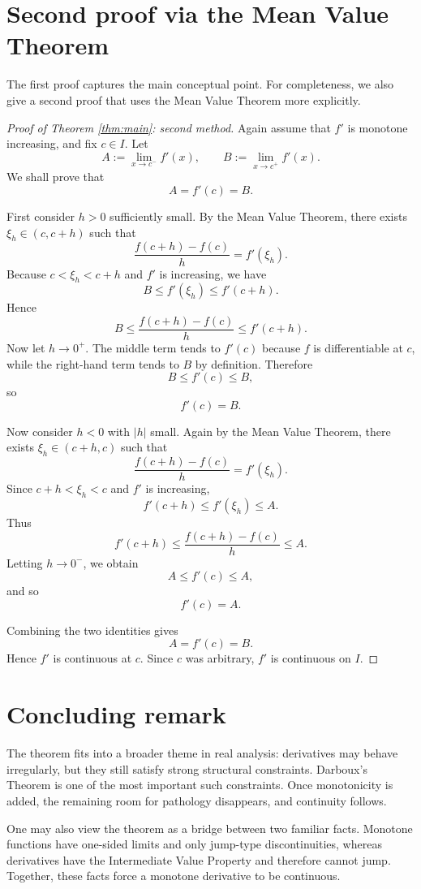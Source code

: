 \documentclass[11pt,a4paper]{amsart}
\theoremstyle{remark}
\begin{document}
\section{Second proof via the Mean Value Theorem}

The first proof captures the main conceptual point.
For completeness, we also give a second proof that uses the Mean Value Theorem more explicitly.

\begin{proof}[Proof of Theorem \ref{thm:main}: second method]
Again assume that $f'$ is monotone increasing, and fix $c\in I$.
Let
\[
A:=\lim_{x\to c^-}f'(x),
\qquad
B:=\lim_{x\to c^+}f'(x).
\]
We shall prove that
\[
A=f'(c)=B.
\]

First consider $h>0$ sufficiently small.
By the Mean Value Theorem, there exists $\xi_h\in(c,c+h)$ such that
\[
\frac{f(c+h)-f(c)}{h}=f'(\xi_h).
\]
Because $c<\xi_h<c+h$ and $f'$ is increasing, we have
\[
B\le f'(\xi_h)\le f'(c+h).
\]
Hence
\[
B\le \frac{f(c+h)-f(c)}{h}\le f'(c+h).
\]
Now let $h\to 0^+$.
The middle term tends to $f'(c)$ because $f$ is differentiable at $c$, while the right-hand term tends to $B$ by definition.
Therefore
\[
B\le f'(c)\le B,
\]
so
\[
f'(c)=B.
\]

Now consider $h<0$ with $|h|$ small.
Again by the Mean Value Theorem, there exists $\xi_h\in(c+h,c)$ such that
\[
\frac{f(c+h)-f(c)}{h}=f'(\xi_h).
\]
Since $c+h<\xi_h<c$ and $f'$ is increasing,
\[
f'(c+h)\le f'(\xi_h)\le A.
\]
Thus
\[
f'(c+h)\le \frac{f(c+h)-f(c)}{h}\le A.
\]
Letting $h\to 0^-$, we obtain
\[
A\le f'(c)\le A,
\]
and so
\[
f'(c)=A.
\]

Combining the two identities gives
\[
A=f'(c)=B.
\]
Hence $f'$ is continuous at $c$.
Since $c$ was arbitrary, $f'$ is continuous on $I$.
\end{proof}

\section{Concluding remark}

The theorem fits into a broader theme in real analysis:
derivatives may behave irregularly, but they still satisfy strong structural constraints.
Darboux's Theorem is one of the most important such constraints.
Once monotonicity is added, the remaining room for pathology disappears, and continuity follows.

One may also view the theorem as a bridge between two familiar facts.
Monotone functions have one-sided limits and only jump-type
discontinuities, whereas derivatives have the Intermediate Value
Property and therefore cannot jump.
Together, these facts force a monotone derivative to be continuous.
\end{document}
